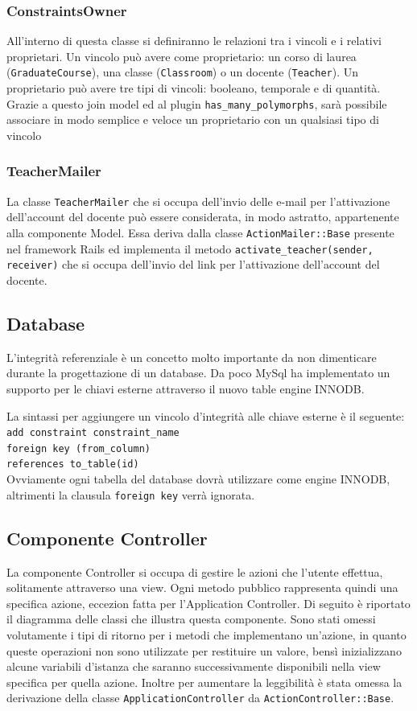 \documentclass[11pt,a4paper]{article}
\begin{document}
\subsubsection{ConstraintsOwner}
All'interno di questa classe si definiranno le relazioni tra i vincoli e i relativi proprietari.
Un vincolo può avere come proprietario: un corso di laurea (\verb|GraduateCourse|), una classe (\verb|Classroom|) o un docente (\verb|Teacher|).
Un proprietario può avere tre tipi di vincoli: booleano, temporale e di quantità.
Grazie a questo join model ed al plugin \verb|has_many_polymorphs|, sarà possibile associare in modo semplice e veloce un proprietario con un qualsiasi tipo di vincolo
\subsubsection{TeacherMailer}
La classe \verb|TeacherMailer| che si occupa dell'invio delle e-mail per l'attivazione dell'account del docente può essere considerata, in modo astratto, appartenente alla componente Model. Essa deriva dalla classe \verb|ActionMailer::Base| presente nel framework Rails ed implementa il metodo \verb|activate_teacher(sender, receiver)| che si occupa dell'invio del link per l'attivazione dell'account del docente.
\subsection{Database}
L'integrità referenziale è un concetto molto importante da non dimenticare durante la progettazione di un database.
Da poco MySql ha implementato un supporto per le chiavi esterne attraverso il nuovo table engine INNODB.

La sintassi per aggiungere un vincolo d'integrità alle chiave esterne è il seguente:\\
\verb|add constraint constraint_name| \\
\verb|foreign key (from_column)|\\
\verb|references to_table(id)|\\
Ovviamente ogni tabella del database dovrà utilizzare come engine INNODB, altrimenti la clausula \verb|foreign key| verrà ignorata.
\subsection{Componente Controller}
La componente Controller si occupa di gestire le azioni che l'utente effettua, solitamente attraverso una view. Ogni metodo pubblico rappresenta quindi una specifica azione, eccezion fatta per l'Application Controller.
Di seguito è riportato il diagramma delle classi che illustra questa componente. Sono stati omessi volutamente i tipi di ritorno per i metodi che implementano un'azione, in quanto queste operazioni non sono utilizzate per restituire un valore, bensì inizializzano alcune variabili d'istanza che saranno successivamente disponibili nella view specifica per quella azione. Inoltre per aumentare la leggibilità è stata omessa la derivazione della classe \verb|ApplicationController| da \verb|ActionController::Base|.
\end{document}
